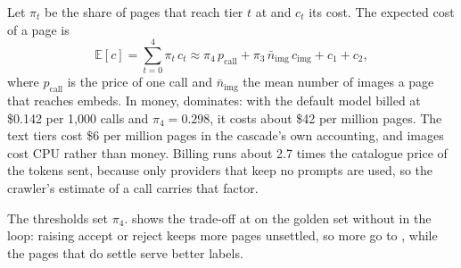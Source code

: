 Let $\pi_t$ be the share of pages that reach tier $t$ at  and $c_t$ its cost. The expected cost of a page is
\begin{equation}\label{eq:cascade-cost}
  \mathbb{E}[c] = \sum_{t=0}^{4} \pi_t\, c_t \approx \pi_4\, p_{\mathrm{call}} + \pi_3\, \bar{n}_{\mathrm{img}}\, c_{\mathrm{img}} + c_1 + c_2,
\end{equation}
where $p_{\mathrm{call}}$ is the price of one  call and $\bar{n}_{\mathrm{img}}$ the mean number of images a page that reaches  embeds. In money,  dominates: with the default model billed at \$0.142 per 1,000 calls and $\pi_4 = 0.298$, it costs about \$42 per million pages. The text tiers cost \$6 per million pages in the cascade's own accounting, and images cost CPU rather than money. Billing runs about 2.7 times the catalogue price of the tokens sent, because only providers that keep no prompts are used, so the crawler's estimate of a call carries that factor.

The thresholds set $\pi_4$.  shows the trade-off at  on the golden set without  in the loop: raising accept or reject keeps more pages unsettled, so more go to , while the pages that do settle serve better labels.

